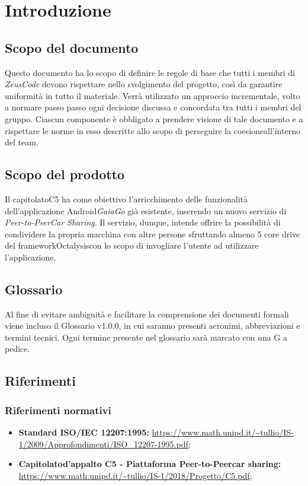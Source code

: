 \section {Introduzione}
\subsection {Scopo del documento}
Questo documento  ha lo scopo di definire le regole di base che tutti i membri di \textit{ZeusCode} devono rispettare nello svolgimento del progetto, così da garantire uniformità in tutto il materiale. Verrà utilizzato un approccio incrementale, volto a normare passo passo ogni decisione discussa e concordata tra tutti i membri del gruppo. Ciascun componente è obbligato a prendere visione di tale documento e a rispettare le norme in esso descritte allo scopo di perseguire la coesione\glosp all'interno del team.
\subsection {Scopo del prodotto}
Il capitolato\glosp C5 ha come obiettivo l'arricchimento delle funzionalità dell'applicazione Android\glosp \textit{GaiaGo} già esistente, inserendo un nuovo servizio di \textit{Peer-to-Peer\glosp Car Sharing}.
Il servizio, dunque, intende offrire la possibilità di condividere la propria macchina con altre persone sfruttando almeno 5 core drive del framework\glosp Octalysis\glosp con lo scopo di invogliare l'utente ad utilizzare l'applicazione.
\subsection {Glossario}
Al fine di evitare ambiguità e facilitare la comprensione dei documenti formali viene incluso il Glossario v1.0.0, in cui saranno presenti acronimi, abbreviazioni e termini tecnici. Ogni termine presente nel glossario sarà marcato con una G a pedice.
\subsection {Riferimenti}
\subsubsection {Riferimenti normativi}

\begin{itemize}
	\item  \textbf{Standard ISO/IEC 12207:1995:}\newline
	\url{https://www.math.unipd.it/~tullio/IS-1/2009/Approfondimenti/ISO_12207-1995.pdf};
	\item \textbf{Capitolato\glosp d'appalto C5 - Piattaforma Peer-to-Peer\glosp car sharing:}\newline 
	\url{https://www.math.unipd.it/~tullio/IS-1/2018/Progetto/C5.pdf};
\end{itemize}

